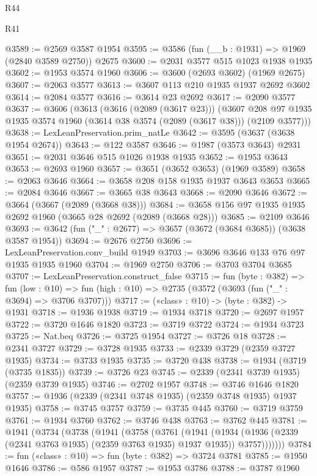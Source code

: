 \begin{lexlean}{R44}
\begin{lexlean}{R41}
\begin{coremodule}
{{{{{{{{{{{{{{{{{{{{{{{{{{{{{{{{{{{{{{{{{{{{{{{{{{{{{{{{{{{{{{{{{{{{{{{{{{{{{{{{{{{{{{{@3589 := @2569 @3587 @1954
@3595 := @3586 (fun (__b : @1931) => @1969 (@2840 @3589 @2750)) @2675
@3600 := @2031 @3577 @515 @1023 @1938 @1935
@3602 := @1953 @3574 @1960
@3606 := @3600 (@2693 @3602) (@1969 @2675)
@3607 := @2063 @3577
@3613 := @3607 @113 @210 @1935 @1937 @2692 @3602
@3614 := @2084 @3577
@3616 := @3614 @23 @2692
@3617 := @2090 @3577
@3637 := @3606
    (@3613
      (@3616 (@2089 (@3617 @23)))
      (@3607 @208 @97 @1935 @1935 @3574 @1960 (@3614 @38 @3574 (@2089 (@3617 @38))) (@2109 @3577)))
@3638 := LexLeanPreservation.prim_natLe
@3642 := @3595 (@3637 (@3638 @1954 @2674))
@3643 := @122 @3587
@3646 := @1987 (@3573 @3643) @2931
@3651 := @2031 @3646 @515 @1026 @1938 @1935
@3652 := @1953 @3643
@3653 := @2693 @1960
@3657 := @3651 (@3652 @3653) (@1969 @3589)
@3658 := @2063 @3646
@3664 := @3658 @208 @158 @1935 @1937 @3643 @3653
@3665 := @2084 @3646
@3667 := @3665 @38 @3643
@3668 := @2090 @3646
@3672 := @3664 (@3667 (@2089 (@3668 @38)))
@3684 := @3658 @156 @97 @1935 @1935 @2692 @1960 (@3665 @28 @2692 (@2089 (@3668 @28)))
@3685 := @2109 @3646
@3693 := @3642 (fun ("_" : @2677) => @3657 (@3672 (@3684 @3685)) (@3638 @3587 @1954))
@3694 := @2676 @2750
@3696 := LexLeanPreservation.conv_build @1949
@3703 := @3696 @3646 @133 @76 @97 @1935 @1935 @1960
@3704 := @1969 @2750
@3706 := @3703 @3704 @3685
@3707 := LexLeanPreservation.construct_false
@3715 := fun (byte : @382) =>
  fun (low : @10) => fun (high : @10) => @2735 (@3572 (@3693 (fun ("_" : @3694) => @3706 @3707)))
@3717 := («class» : @10) -> (byte : @382) -> @1931
@3718 := @1936 @1938
@3719 := @1934 @3718
@3720 := @2697 @1957
@3722 := @3720 @1646 @1820
@3723 := @3719 @3722
@3724 := @1934 @3723
@3725 := Nat.beq
@3726 := @3725 @1954
@3727 := @3726 @18
@3728 := @2341 @3727
@3729 := @3728 @1935
@3733 := @2339 @3729 (@2359 @3727 @1935)
@3734 := @3733 @1935
@3735 := @3720 @438
@3738 := @1934 (@3719 (@3735 @1835))
@3739 := @3726 @23
@3745 := @2339 (@2341 @3739 @1935) (@2359 @3739 @1935)
@3746 := @2702 @1957
@3748 := @3746 @1646 @1820
@3757 := @1936 (@2339 (@2341 @3748 @1935) (@2359 @3748 @1935) @1937 @1935)
@3758 := @3745 @3757
@3759 := @3735 @445
@3760 := @3719 @3759
@3761 := @1934 @3760
@3762 := @3746 @438
@3763 := @3762 @445
@3781 := @1941
    (@3734
      (@3738
        (@1941
          (@3758
            (@3761
              (@1941
                (@1934
                  (@1936 (@2339 (@2341 @3763 @1935) (@2359 @3763 @1935) @1937 @1935))
                  @3757)))))))
@3784 := fun («class» : @10) => fun (byte : @382) => @3724 @3781
@3785 := @1950 @1646
@3786 := @586 @1957
@3787 := @1953 @3786
@3788 := @3787 @1960
}}}}}}}}}}}}}}}}}}}}}}}}}}}}}}}}}}}}}}}}}}}}}}}}}}}}}}}}}}}}}}}}}}}}}}}}}}}}}}}}}}}}}}}
\end{coremodule}
\end{lexlean}
\end{lexlean}
